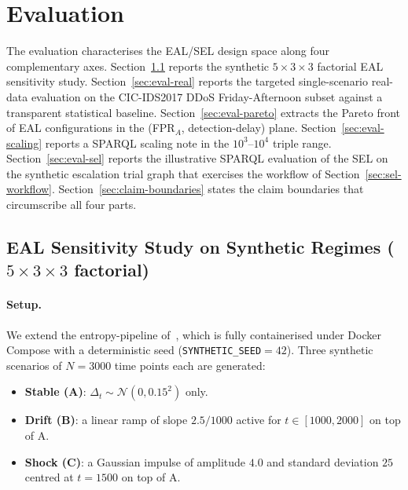 \documentclass[futureinternet,article,submit,pdftex,moreauthors]{Definitions/mdpi}
\begin{document}
\section{Evaluation}
\label{sec:evaluation}

The evaluation characterises the EAL/SEL design space along four
complementary axes. Section~\ref{sec:eval-eal} reports the synthetic
$5\times 3\times 3$ factorial EAL sensitivity study.
Section~\ref{sec:eval-real} reports the targeted single-scenario
real-data evaluation on the CIC-IDS2017 DDoS Friday-Afternoon subset
against a transparent statistical baseline.
Section~\ref{sec:eval-pareto} extracts the Pareto front of EAL
configurations in the (FPR$_A$, detection-delay) plane.
Section~\ref{sec:eval-scaling} reports a SPARQL scaling note in the
$10^{3}$--$10^{4}$ triple range. Section~\ref{sec:eval-sel} reports the
illustrative SPARQL evaluation of the SEL on the synthetic escalation
trial graph that exercises the workflow of
Section~\ref{sec:sel-workflow}. Section~\ref{sec:claim-boundaries}
states the claim boundaries that circumscribe all four parts.

\subsection{EAL Sensitivity Study on Synthetic Regimes
(\texorpdfstring{$5 \times 3 \times 3$}{5x3x3} factorial)}
\label{sec:eval-eal}

\paragraph{Setup.} We extend the entropy-pipeline of~\cite{berto2026},
which is fully containerised under Docker Compose with a deterministic
seed (\texttt{SYNTHETIC\_SEED}$=42$). Three synthetic scenarios of $N=3000$
time points each are generated:

\begin{itemize}[leftmargin=*]
\item \textbf{Stable (A)}: $\Delta_t \sim \mathcal{N}(0, 0.15^2)$ only.
\item \textbf{Drift (B)}: a linear ramp of slope $2.5/1000$ active for
  $t \in [1000, 2000]$ on top of A.
\item \textbf{Shock (C)}: a Gaussian impulse of amplitude $4.0$ and
  standard deviation $25$ centred at $t = 1500$ on top of A.
\end{itemize}
\end{document}
